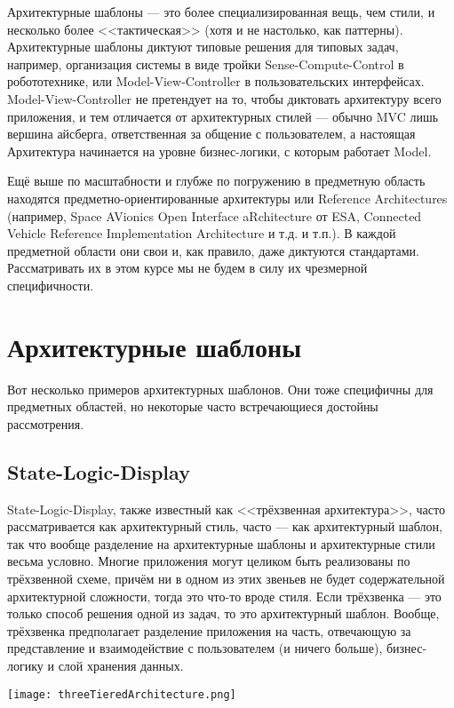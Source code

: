 \documentclass{../../text-style}
\begin{document}
Архитектурные шаблоны --- это более специализированная вещь, чем стили, и несколько более <<тактическая>> (хотя и не настолько, как паттерны). Архитектурные шаблоны диктуют типовые решения для типовых задач, например, организация системы в виде тройки Sense-Compute-Control в робототехнике, или Model-View-Controller в пользовательских интерфейсах. Model-View-Controller не претендует на то, чтобы диктовать архитектуру всего приложения, и тем отличается от архитектурных стилей --- обычно MVC лишь вершина айсберга, ответственная за общение с пользователем, а настоящая Архитектура начинается на уровне бизнес-логики, с которым работает Model.

Ещё выше по масштабности и глубже по погружению в предметную область находятся предметно-ориентированные архитектуры или Reference Architectures (например, Space AVionics Open Interface aRchitecture от ESA, Connected Vehicle Reference Implementation Architecture и т.д. и т.п.). В каждой предметной области они свои и, как правило, даже диктуются стандартами. Рассматривать их в этом курсе мы не будем в силу их чрезмерной специфичности.

\section{Архитектурные шаблоны}

Вот несколько примеров архитектурных шаблонов. Они тоже специфичны для предметных областей, но некоторые часто встречающиеся достойны рассмотрения.

\subsection{State-Logic-Display}

\noindent\begin{minipage}{\textwidth}
    \begin{minipage}[c][6cm][c]{\dimexpr0.7\textwidth-0.5\Colsep\relax}
        State-Logic-Display, также известный как <<трёхзвенная архитектура>>, часто рассматривается как архитектурный стиль, часто --- как архитектурный шаблон, так что вообще разделение на архитектурные шаблоны и архитектурные стили весьма условно. Многие приложения могут целиком быть реализованы по трёхзвенной схеме, причём ни в одном из этих звеньев не будет содержательной архитектурной сложности, тогда это что-то вроде стиля. Если трёхзвенка --- это только способ решения одной из задач, то это архитектурный шаблон. Вообще, трёхзвенка предполагает разделение приложения на часть, отвечающую за представление и взаимодействие с пользователем (и ничего больше), бизнес-логику и слой хранения данных.
    \end{minipage}\hfill
    \begin{minipage}[c][6cm][c]{\dimexpr0.3\textwidth-0.5\Colsep\relax}
        \texttt{[image: threeTieredArchitecture.png]}
    \end{minipage}%
\end{minipage}
\end{document}
